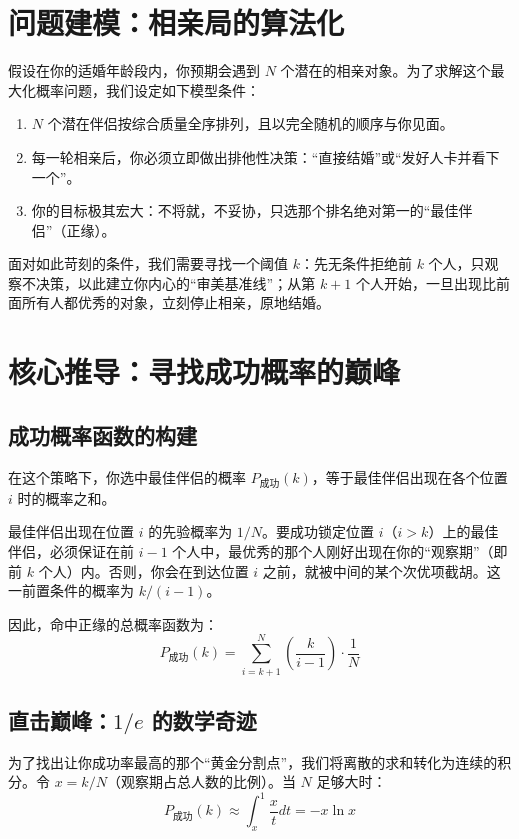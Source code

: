 \documentclass[11pt, a4paper, UTF8]{chinese-erj}
\begin{document}
\section{问题建模：相亲局的算法化}

假设在你的适婚年龄段内，你预期会遇到 $N$ 个潜在的相亲对象。为了求解这个最大化概率问题，我们设定如下模型条件：
\begin{enumerate}
    \item $N$ 个潜在伴侣按综合质量全序排列，且以完全随机的顺序与你见面。
    \item 每一轮相亲后，你必须立即做出排他性决策：“直接结婚”或“发好人卡并看下一个”。
    \item 你的目标极其宏大：不将就，不妥协，只选那个排名绝对第一的“最佳伴侣”（正缘）。
\end{enumerate}

面对如此苛刻的条件，我们需要寻找一个阈值 $k$：先无条件拒绝前 $k$ 个人，只观察不决策，以此建立你内心的“审美基准线”；从第 $k+1$ 个人开始，一旦出现比前面所有人都优秀的对象，立刻停止相亲，原地结婚。

\section{核心推导：寻找成功概率的巅峰}

\subsection{成功概率函数的构建}
在这个策略下，你选中最佳伴侣的概率 $P_{\text{成功}}(k)$，等于最佳伴侣出现在各个位置 $i$ 时的概率之和。

最佳伴侣出现在位置 $i$ 的先验概率为 $1/N$。要成功锁定位置 $i$（$i > k$）上的最佳伴侣，必须保证在前 $i-1$ 个人中，最优秀的那个人刚好出现在你的“观察期”（即前 $k$ 个人）内。否则，你会在到达位置 $i$ 之前，就被中间的某个次优项截胡。这一前置条件的概率为 $k/(i-1)$。

因此，命中正缘的总概率函数为：
\begin{equation}
    P_{\text{成功}}(k) = \sum_{i=k+1}^N \left( \frac{k}{i-1} \right) \cdot \frac{1}{N}
\end{equation}

\subsection{直击巅峰：$1/e$ 的数学奇迹}
为了找出让你成功率最高的那个“黄金分割点”，我们将离散的求和转化为连续的积分。令 $x = k/N$（观察期占总人数的比例）。当 $N$ 足够大时：
\begin{equation}
    P_{\text{成功}}(k) \approx \int_{x}^{1} \frac{x}{t} dt = -x \ln x
\end{equation}
\end{document}
